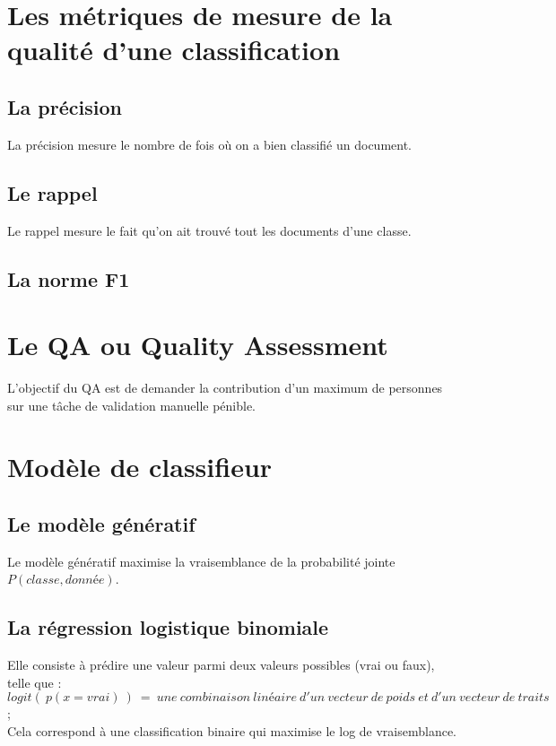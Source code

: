 \section{Les métriques de mesure de la qualité d'une classification}
    \subsection{La précision}
    \label{annexe:precision}
        La précision mesure le nombre de fois où on a bien classifié un document.

    \subsection{Le rappel}
    \label{annexe:rappel}
        Le rappel mesure le fait qu'on ait trouvé tout les documents d'une classe.

    \subsection{La norme F1}

\section{Le QA ou Quality Assessment}
\label{annexe:qa}
    L'objectif du QA est de demander la contribution d'un maximum de personnes sur une tâche de validation manuelle pénible.\\

\section{Modèle de classifieur}
    \subsection{Le modèle génératif}
    \label{annexe:generatif}
        Le modèle génératif maximise la vraisemblance de la probabilité jointe $P(classe, donnée)$.

    \subsection{La régression logistique binomiale}
    \label{annexe:reglog}
        Elle consiste à prédire une valeur parmi deux valeurs possibles (vrai ou faux), telle que :\\
        $logit(\ p(x=vrai)\ )\ =\ une\ combinaison\ linéaire\ d'un\ vecteur\ de\ poids\ et\ d'un\ vecteur\ de\ traits$ ;\\
        Cela correspond à une classification binaire qui maximise le log de vraisemblance.

